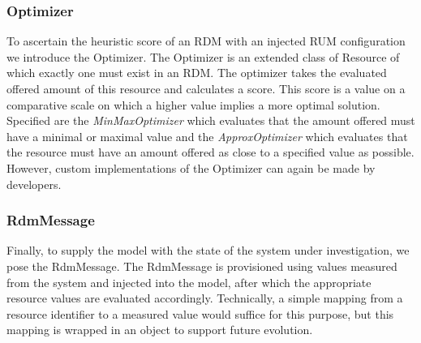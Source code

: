 \subsubsection{Optimizer}
To ascertain the heuristic score of an RDM with an injected RUM configuration we introduce the Optimizer. The Optimizer is an extended class of Resource of which exactly one must exist in an RDM. The optimizer takes the evaluated offered amount of this resource and calculates a score. This score is a value on a comparative scale on which a higher value implies a more optimal solution. Specified are the \emph{MinMaxOptimizer} which evaluates that the amount offered must have a minimal or maximal value and the \emph{ApproxOptimizer} which evaluates that the resource must have an amount offered as close to a specified value as possible. However, custom implementations of the Optimizer can again be made by developers.

\subsubsection{RdmMessage}
Finally, to supply the model with the state of the system under investigation, we pose the RdmMessage. The RdmMessage is provisioned using values measured from the system and injected into the model, after which the appropriate resource values are evaluated accordingly. Technically, a simple mapping from a resource identifier to a measured value would suffice for this purpose, but this mapping is wrapped in an object to support future evolution.


